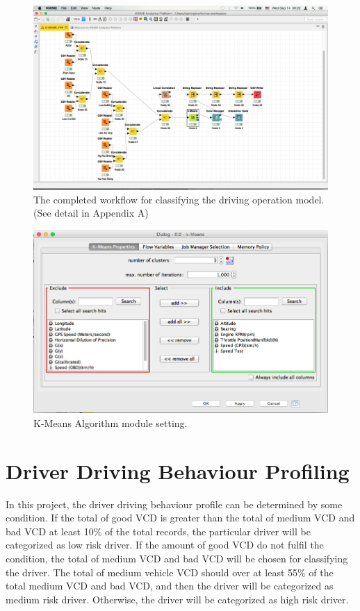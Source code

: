 \begin{figure}[hbt!]\centering
\includegraphics[width=.75\textwidth]{image/KNIMEfile}
\caption{The completed workflow for classifying the driving operation model.(See detail in Appendix A)}
\label{fig:workflow}
\end{figure}

\begin{figure}[hbt!]\centering
\includegraphics[width=.75\textwidth]{image/KNIMEkmean}
\caption{K-Means Algorithm module setting.}
\label{fig:kmean}
\end{figure}



\section{Driver Driving Behaviour Profiling}
In this project, the driver driving behaviour profile can be determined by some condition. %
If the total of good VCD is greater than the total of medium VCD and bad VCD at least 10\% of the total records, the particular driver will be categorized as low risk driver. If the amount of good VCD do not fulfil the condition, the total of medium VCD and bad VCD will be chosen for classifying the driver. The total of medium vehicle VCD should over at least 55\% of the total medium VCD and bad VCD, and then the driver will be categorized as medium risk driver. Otherwise, the driver will be categorized as high risk driver.

